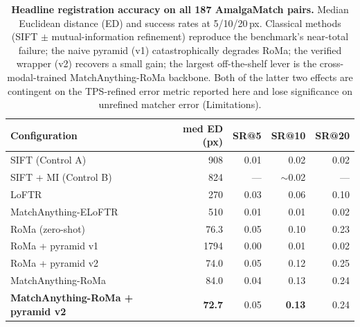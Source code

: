 \documentclass[fleqn,10pt]{wlscirep}
\begin{document}
\begin{table}[ht]
\centering
\begin{tabular}{lrrrr}
\hline
Configuration & med ED (px) & SR@5 & SR@10 & SR@20 \\
\hline
SIFT (Control A)            & 908   & 0.01 & 0.02 & 0.02 \\
SIFT + MI (Control B)       & 824   & ---  & $\sim$0.02 & --- \\
LoFTR                       & 270   & 0.03 & 0.06 & 0.10 \\
MatchAnything-ELoFTR        & 510   & 0.01 & 0.01 & 0.02 \\
RoMa (zero-shot)            & 76.3  & 0.05 & 0.10 & 0.23 \\
RoMa + pyramid v1           & 1794  & 0.00 & 0.01 & 0.02 \\
RoMa + pyramid v2           & 74.0  & 0.05 & 0.12 & 0.25 \\
MatchAnything-RoMa          & 84.0  & 0.04 & 0.13 & 0.24 \\
\textbf{MatchAnything-RoMa + pyramid v2} & \textbf{72.7} & 0.05 & \textbf{0.13} & 0.24 \\
\hline
\end{tabular}
\caption{\textbf{Headline registration accuracy on all 187 AmalgaMatch pairs.} Median Euclidean distance (ED) and success rates at 5/10/20\,px. Classical methods (SIFT $\pm$ mutual-information refinement) reproduce the benchmark's near-total failure; the naive pyramid (v1) catastrophically degrades RoMa; the verified wrapper (v2) recovers a small gain; the largest off-the-shelf lever is the cross-modal-trained MatchAnything-RoMa backbone. Both of the latter two effects are contingent on the TPS-refined error metric reported here and lose significance on unrefined matcher error (Limitations).}
\label{tab:headline}
\end{table}
\end{document}

